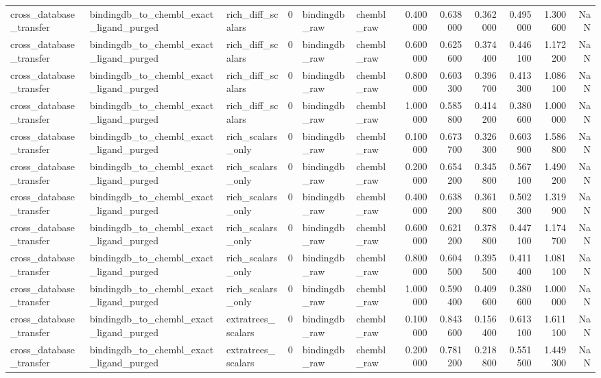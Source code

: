 \begin{longtable}{lllrllrrrrrr}
cross\_database\_transfer & bindingdb\_to\_chembl\_exact\_ligand\_purged & rich\_diff\_scalars & 0 & bindingdb\_raw & chembl\_raw & 0.400000 & 0.638000 & 0.362000 & 0.495000 & 1.300600 & NaN \\
cross\_database\_transfer & bindingdb\_to\_chembl\_exact\_ligand\_purged & rich\_diff\_scalars & 0 & bindingdb\_raw & chembl\_raw & 0.600000 & 0.625600 & 0.374400 & 0.446100 & 1.172200 & NaN \\
cross\_database\_transfer & bindingdb\_to\_chembl\_exact\_ligand\_purged & rich\_diff\_scalars & 0 & bindingdb\_raw & chembl\_raw & 0.800000 & 0.603300 & 0.396700 & 0.413300 & 1.086100 & NaN \\
cross\_database\_transfer & bindingdb\_to\_chembl\_exact\_ligand\_purged & rich\_diff\_scalars & 0 & bindingdb\_raw & chembl\_raw & 1.000000 & 0.585800 & 0.414200 & 0.380600 & 1.000000 & NaN \\
cross\_database\_transfer & bindingdb\_to\_chembl\_exact\_ligand\_purged & rich\_scalars\_only & 0 & bindingdb\_raw & chembl\_raw & 0.100000 & 0.673700 & 0.326300 & 0.603900 & 1.586800 & NaN \\
cross\_database\_transfer & bindingdb\_to\_chembl\_exact\_ligand\_purged & rich\_scalars\_only & 0 & bindingdb\_raw & chembl\_raw & 0.200000 & 0.654200 & 0.345800 & 0.567100 & 1.490200 & NaN \\
cross\_database\_transfer & bindingdb\_to\_chembl\_exact\_ligand\_purged & rich\_scalars\_only & 0 & bindingdb\_raw & chembl\_raw & 0.400000 & 0.638200 & 0.361800 & 0.502300 & 1.319900 & NaN \\
cross\_database\_transfer & bindingdb\_to\_chembl\_exact\_ligand\_purged & rich\_scalars\_only & 0 & bindingdb\_raw & chembl\_raw & 0.600000 & 0.621200 & 0.378800 & 0.447100 & 1.174700 & NaN \\
cross\_database\_transfer & bindingdb\_to\_chembl\_exact\_ligand\_purged & rich\_scalars\_only & 0 & bindingdb\_raw & chembl\_raw & 0.800000 & 0.604500 & 0.395500 & 0.411400 & 1.081100 & NaN \\
cross\_database\_transfer & bindingdb\_to\_chembl\_exact\_ligand\_purged & rich\_scalars\_only & 0 & bindingdb\_raw & chembl\_raw & 1.000000 & 0.590400 & 0.409600 & 0.380600 & 1.000000 & NaN \\
cross\_database\_transfer & bindingdb\_to\_chembl\_exact\_ligand\_purged & extratrees\_scalars & 0 & bindingdb\_raw & chembl\_raw & 0.100000 & 0.843600 & 0.156400 & 0.613100 & 1.611100 & NaN \\
cross\_database\_transfer & bindingdb\_to\_chembl\_exact\_ligand\_purged & extratrees\_scalars & 0 & bindingdb\_raw & chembl\_raw & 0.200000 & 0.781200 & 0.218800 & 0.551500 & 1.449300 & NaN \\

\end{longtable}
